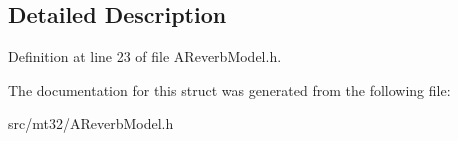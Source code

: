 \subsection{Detailed Description}


Definition at line 23 of file A\-Reverb\-Model.\-h.



The documentation for this struct was generated from the following file\-:\begin{DoxyCompactItemize}
\item 
src/mt32/A\-Reverb\-Model.\-h\end{DoxyCompactItemize}

